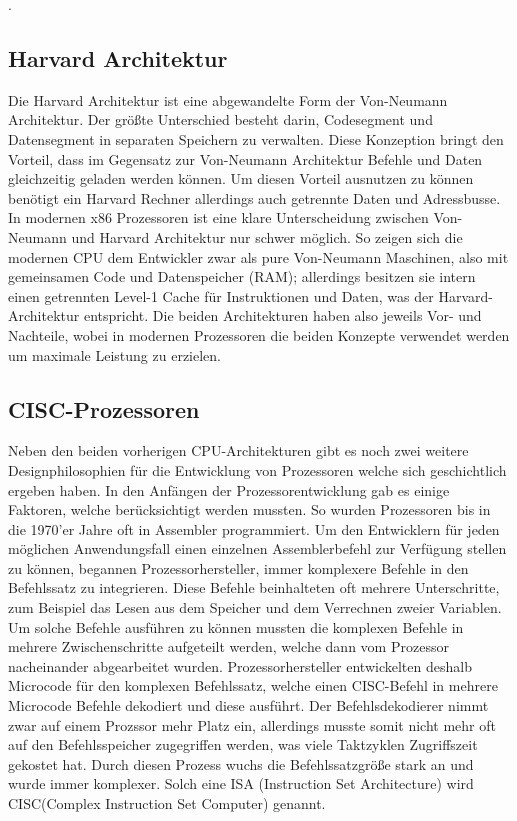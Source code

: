 \documentclass[12pt]{article}
\begin{document}
\cite{unikoelnvnz}.
\subsection{Harvard Architektur} 
Die Harvard Architektur ist eine abgewandelte Form der Von-Neumann Architektur. Der größte Unterschied besteht darin, Codesegment und Datensegment in separaten Speichern zu verwalten. Diese Konzeption bringt den Vorteil, dass im Gegensatz zur Von-Neumann Architektur Befehle und Daten gleichzeitig geladen werden können. Um diesen Vorteil ausnutzen zu können benötigt ein Harvard Rechner allerdings auch getrennte Daten und Adressbusse. 
\newline
\newline
In modernen x86 Prozessoren ist eine klare Unterscheidung zwischen Von-Neumann und Harvard Architektur nur schwer möglich. So zeigen sich die modernen CPU dem Entwickler zwar als pure Von-Neumann Maschinen, also mit gemeinsamen Code und Datenspeicher (RAM); allerdings besitzen sie intern einen getrennten Level-1 Cache für Instruktionen und Daten, was der Harvard-Architektur entspricht. Die beiden Architekturen haben also jeweils Vor- und Nachteile, wobei in modernen Prozessoren die beiden Konzepte verwendet werden um maximale Leistung zu erzielen.
\subsection{CISC-Prozessoren}
Neben den beiden vorherigen CPU-Architekturen gibt es noch zwei weitere Designphilosophien für die Entwicklung von Prozessoren welche sich geschichtlich ergeben haben. In den Anfängen der Prozessorentwicklung gab es einige Faktoren, welche berücksichtigt werden mussten. So wurden Prozessoren bis in die 1970'er Jahre oft in Assembler programmiert. Um den Entwicklern für jeden möglichen Anwendungsfall einen einzelnen Assemblerbefehl zur Verfügung stellen zu können, begannen Prozessorhersteller, immer komplexere Befehle in den Befehlssatz zu integrieren. Diese Befehle beinhalteten oft mehrere Unterschritte, zum Beispiel das Lesen aus dem Speicher und dem Verrechnen zweier Variablen. Um solche Befehle ausführen zu können mussten die komplexen Befehle in mehrere Zwischenschritte aufgeteilt werden, welche dann vom Prozessor nacheinander abgearbeitet wurden. Prozessorhersteller entwickelten deshalb Microcode für den komplexen Befehlssatz, welche einen CISC-Befehl in mehrere Microcode Befehle dekodiert und diese ausführt. Der Befehlsdekodierer nimmt zwar auf einem Prozssor mehr Platz ein, allerdings musste somit nicht mehr oft auf den Befehlsspeicher zugegriffen werden, was viele Taktzyklen Zugriffszeit gekostet hat. Durch diesen Prozess wuchs die Befehlssatzgröße stark an und wurde immer komplexer. Solch eine ISA (Instruction Set Architecture) wird CISC(Complex Instruction Set Computer) genannt.	
\end{document}
